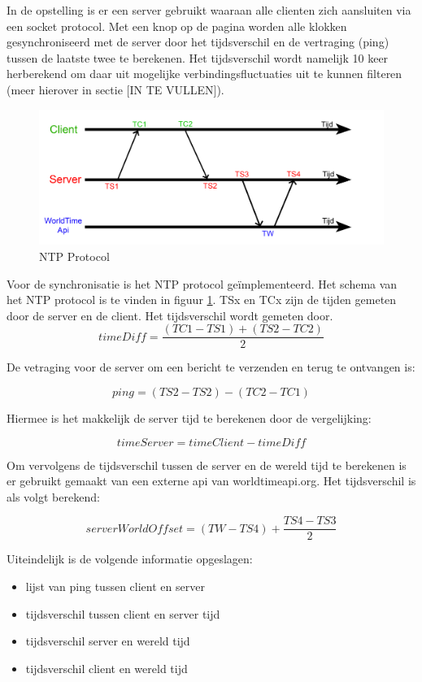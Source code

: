 In de opstelling is er een server gebruikt waaraan alle clienten zich aansluiten via een socket protocol. Met een knop op de pagina worden alle klokken gesynchroniseerd met de server door het tijdsverschil en de vertraging (ping) tussen de laatste twee te berekenen.
Het tijdsverschil wordt namelijk 10 keer herberekend om daar uit mogelijke verbindingsfluctuaties uit te kunnen filteren (meer hierover in sectie [IN TE VULLEN]).

\begin{figure}[h]
\centering
\includegraphics[scale=0.4]{img/server-client-sync.jpg}
\caption{NTP Protocol} \label{serv-client}
\end{figure}

Voor de synchronisatie is het NTP protocol geïmplementeerd. 
Het schema van het NTP protocol is te vinden in figuur \ref{serv-client}. TSx en TCx zijn de tijden gemeten door de server en de client.
Het tijdsverschil wordt gemeten door.
\newline
\[ timeDiff = \frac{(TC1 - TS1) + (TS2 - TC2)}{2}  \]

De vetraging voor de server om een bericht te verzenden en terug te ontvangen is:

\[ ping  = (TS2 - TS2) - (TC2 - TC1) \]


Hiermee is het makkelijk de server tijd te berekenen door de vergelijking:

\[ timeServer = timeClient - timeDiff \]

Om vervolgens de tijdsverschil tussen de server en de wereld tijd te berekenen is er gebruikt gemaakt van een externe api van worldtimeapi.org. Het tijdsverschil is als volgt berekend:

\[ serverWorldOffset = (TW - TS4) + \frac{TS4 - TS3}{2} \]

Uiteindelijk is de volgende informatie opgeslagen:

\begin{itemize}
  \item lijst van ping tussen client en server
  \item tijdsverschil tussen client en server tijd
  \item tijdsverschil server en wereld tijd
  \item tijdsverschil client en wereld tijd
\end{itemize}




